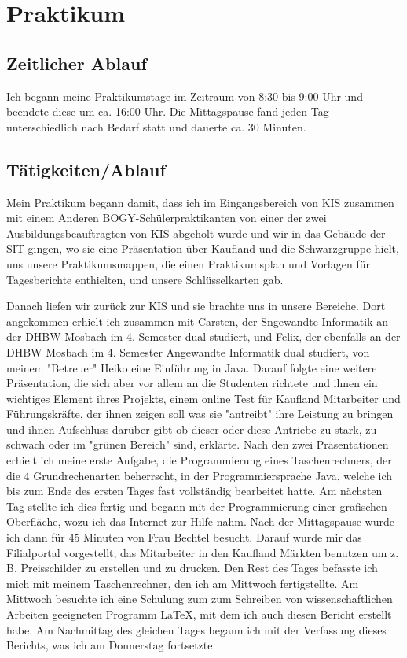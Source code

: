 \chapter{Praktikum}

\section{Zeitlicher Ablauf}

Ich begann meine Praktikumstage im Zeitraum von 8:30 bis 9:00 Uhr und beendete diese um ca. 16:00 Uhr. Die Mittagspause fand jeden Tag unterschiedlich nach Bedarf statt und dauerte ca. 30 Minuten. 

\section{Tätigkeiten/Ablauf}

Mein Praktikum begann damit, dass ich im Eingangsbereich von KIS zusammen mit einem Anderen BOGY-Schülerpraktikanten von einer der zwei Ausbildungsbeauftragten von KIS abgeholt wurde und wir in das Gebäude der SIT gingen, wo sie eine Präsentation über Kaufland und die Schwarzgruppe hielt, uns unsere Praktikumsmappen, die einen Praktikumsplan und Vorlagen für Tagesberichte enthielten, und unsere Schlüsselkarten gab.

Danach liefen wir zurück zur KIS und sie brachte uns in unsere Bereiche. Dort angekommen erhielt ich zusammen mit Carsten, der Sngewandte Informatik an der DHBW Mosbach im 4. Semester dual studiert, und Felix, der ebenfalls an der DHBW Mosbach im 4. Semester Angewandte Informatik dual studiert, von meinem "Betreuer" Heiko eine Einführung in Java. Darauf folgte eine weitere Präsentation, die sich aber vor allem an die Studenten richtete und ihnen ein wichtiges Element ihres Projekts, einem online Test für Kaufland Mitarbeiter und Führungskräfte, der ihnen zeigen soll was sie "antreibt" ihre Leistung zu bringen und ihnen Aufschluss darüber gibt ob dieser oder diese Antriebe zu stark, zu schwach oder im "grünen Bereich" sind, erklärte. Nach den zwei Präsentationen erhielt ich meine erste Aufgabe, die Programmierung eines Taschenrechners, der die 4 Grundrechenarten beherrscht, in der Programmiersprache Java, welche ich bis zum Ende des ersten Tages fast vollständig bearbeitet hatte. Am nächsten Tag stellte ich dies fertig und begann mit der Programmierung einer grafischen Oberfläche, wozu ich das Internet zur Hilfe nahm. Nach der Mittagspause wurde ich dann für 45 Minuten von Frau Bechtel besucht. Darauf wurde mir das Filialportal vorgestellt, das Mitarbeiter in den Kaufland Märkten benutzen um z. B. Preisschilder zu erstellen und zu drucken. Den Rest des Tages befasste ich mich mit meinem Taschenrechner, den ich am Mittwoch fertigstellte. Am Mittwoch besuchte ich eine Schulung zum zum Schreiben von wissenschaftlichen Arbeiten geeigneten Programm LaTeX, mit dem ich auch diesen Bericht erstellt habe. Am Nachmittag des gleichen Tages begann ich mit der Verfassung dieses Berichts, was ich am Donnerstag fortsetzte. 


